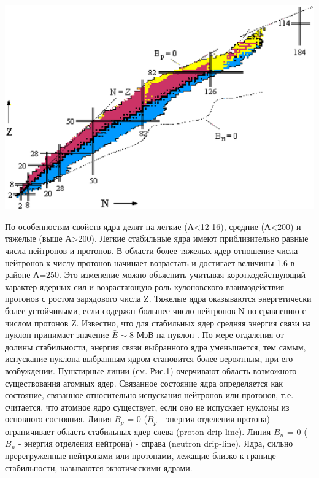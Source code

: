 {
	\centering
	\includegraphics[width=1\linewidth]{NuclearMap.eps}
	\label{ris:NuclearMap}
}


По особенностям свойств ядра делят на легкие (А<12-16), средние (А<200) и тяжелые (выше А>200). Легкие стабильные ядра имеют приблизительно равные числа нейтронов и протонов. В области более тяжелых ядер отношение числа нейтронов к числу протонов начинает возрастать и достигает величины 1.6 в районе А=250. Это изменение можно объяснить учитывая короткодействующий характер ядерных сил и возрастающую роль кулоновского взаимодействия протонов с ростом зарядового числа Z. Тяжелые ядра оказываются энергетически более устойчивыми, если содержат большее число нейтронов N по сравнению с числом протонов Z. Известно, что для стабильных ядер средняя энергия связи на нуклон принимает значение $\bar{E}\sim8$ МэВ на нуклон \cite{inet}. По мере отдаления от долины стабильности, энергия связи выбранного ядра уменьшается, тем самым, испускание нуклона выбранным ядром становится более вероятным, при его возбуждении. Пунктирные линии (см. Рис.1) очерчивают область возможного существования атомных ядер. Связанное состояние ядра определяется как состояние, связанное относительно испускания нейтронов или протонов, т.е. считается, что атомное ядро существует, если оно не испускает нуклоны из основного состояния. Линия $B_p$ = 0 ($B_p$ - энергия отделения протона) ограничивает область стабильных ядер слева (proton drip-line). Линия $B_n$ = 0 ($B_n$ - энергия отделения нейтрона) - справа (neutron drip-line). Ядра, сильно пререгруженные нейтронами или протонами, лежащие близко к границе стабильности, называются экзотическими ядрами.

